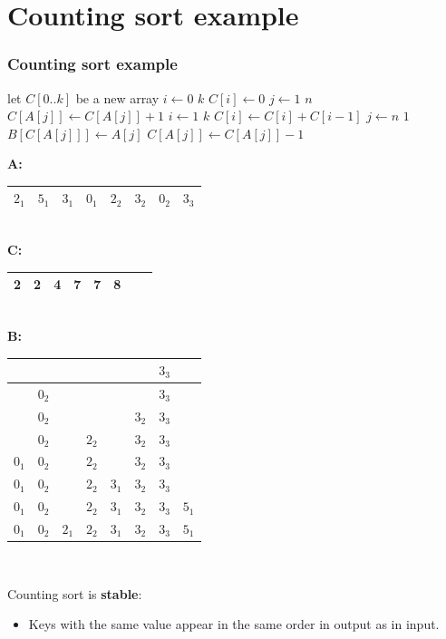 \documentclass{beamer}
\newcommand{\bi}{\begin{itemize}}
\newcommand{\ii}{\item}
\newcommand{\ei}{\end{itemize}}
\newcommand{\sect}[1]{
\section{#1}
\begin{frame}[fragile]\frametitle{#1}
}
\begin{document}
\sect{Counting sort example}
\begin{multicols}{2}
\begin{codebox}
  \li let $C[0..k]$ be a new array
  \li \For $i\gets 0$ \To $k$ \Do
  \li $C[i] \gets 0$ \End
  \li \For $j\gets 1$ \To $n$ \Do
  \li $C[A[j]] \gets C[A[j]]+1$ \End
  \li \For $i\gets 1$ \To $k$ \Do
  \li $C[i] \gets C[i] + C[i-1]$ \End
  \li \For $j \gets n$ \Downto $1$ \Do
  \li $B[C[A[j]]] \gets A[j]$
  \li $C[A[j]] \gets C[A[j]]-1$ \End
\End
\end{codebox}
\columnbreak

{\footnotesize

{\bf A:}
\begin{tabular}{|c|c|c|c|c|c|c|c|}\hline
 $2_1$ & $5_1$ & $3_1$ & $0_1$ & $2_2$ & $3_2$ & $0_2$ & $3_3$ \\\hline
\end{tabular}\\

{\bf C:}\begin{tabular}{|c|c|c|c|c|c|c|c|}\hline
 2 & 2 & 4 & 7 & 7 & 8\\\hline
  \end{tabular}\\

{\bf B:}
\begin{tabular}{|c|c|c|c|c|c|c|c|}\hline
 & & & & & & $3_3$ & \\\hline
 & $0_2$ & & & & & $3_3$ & \\\hline
 & $0_2$ & & & & $3_2$ & $3_3$ & \\\hline
 & $0_2$ & & $2_2$ & & $3_2$ & $3_3$ & \\\hline
$0_1$ & $0_2$ & & $2_2$ & & $3_2$ & $3_3$ & \\\hline
$0_1$ & $0_2$ & & $2_2$ & $3_1$ & $3_2$ & $3_3$ & \\\hline
$0_1$ & $0_2$ & & $2_2$ & $3_1$ & $3_2$ & $3_3$ & $5_1$\\\hline
$0_1$ & $0_2$ & $2_1$ & $2_2$ & $3_1$ & $3_2$ & $3_3$ & $5_1$\\\hline
\end{tabular}\\

}

\end{multicols}

 Counting sort is {\bf stable}:
\bi
\ii Keys with the same value appear in the same order
in output as in input.
\ei
\end{frame}
\end{document}
